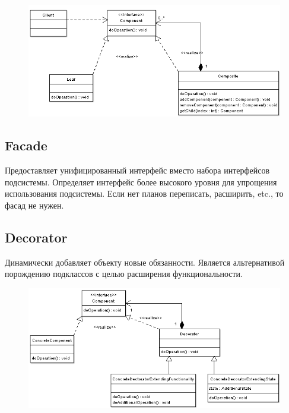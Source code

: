 \documentclass[11pt,a4paper]{article}
\begin{document}
\begin{figure}[H]
	\centering
	\includegraphics[width=400pt]{pics/composite-pattern.png}
\end{figure}

\subsection{Facade}
Предоставляет унифицированный интерфейс вместо набора интерфейсов подсистемы. Определяет интерфейс более высокого уровня для упрощения использования подсистемы. Если нет планов переписать, расширить, etc., то фасад не нужен.

\subsection{Decorator}
Динамически добавляет объекту новые обязанности. Является альтернативой порождению подклассов с целью расширения функциональности.

\begin{figure}[H]
	\centering
	\includegraphics[width=400pt]{pics/decorator-pattern.png}
\end{figure}
\end{document}
